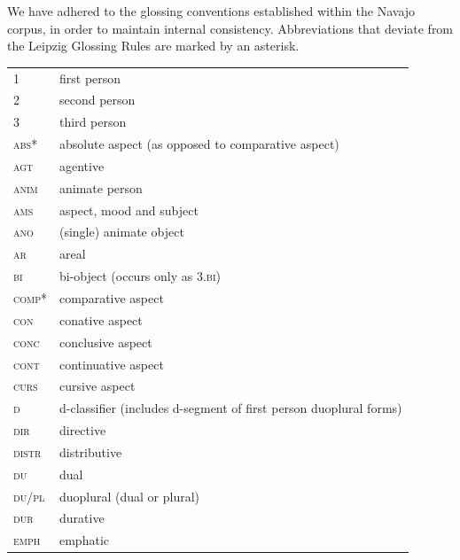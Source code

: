 \addchap{\lsAbbreviationsTitle}

We have adhered to the glossing conventions established within the Navajo corpus, in order to maintain internal consistency. Abbreviations that deviate from the Leipzig Glossing Rules are marked by an asterisk.\\

\begin{tabularx}{.45\textwidth}{lQ}
1 & first person\\
2 & second person\\
3 & third person\\
\textsc{abs*} & absolute aspect (as opposed to comparative aspect)\\
\textsc{agt} & agentive\\
\textsc{anim} & animate person\\
\textsc{ams} & aspect, mood and subject\\
\textsc{ano} & (single) animate object\\
\textsc{ar} & areal\\
\textsc{bi} & bi-object (occurs only as \textsc{3}.\textsc{bi})\\
\textsc{comp*} & comparative aspect\\
\textsc{con} & conative aspect\\
\textsc{conc} & conclusive aspect\\
\textsc{cont} & continuative aspect\\
\textsc{curs} & cursive aspect\\
\textsc{d} & d-classifier (includes d-segment of first person duoplural forms)\\
\textsc{dir} & directive\\
\textsc{distr} & distributive\\
\textsc{du} & dual\\
\textsc{du}/\textsc{pl}&duoplural (dual or plural)\\
\textsc{dur} & durative\\
\textsc{emph} & emphatic\\
\end{tabularx}
